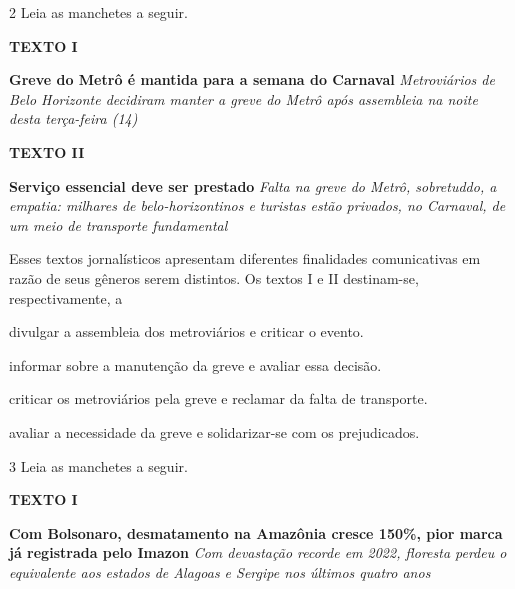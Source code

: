 \num{2} Leia as manchetes a seguir.

\textbf{TEXTO I}

\begin{myquote}
\textbf{Greve do Metrô é mantida para a semana do Carnaval}
\emph{Metroviários de Belo Horizonte decidiram manter a greve do Metrô
após assembleia na noite desta terça-feira (14)}
\end{myquote}


\textbf{TEXTO II}

\begin{myquote}
\textbf{Serviço essencial deve ser prestado} \emph{Falta na greve do
Metrô, sobretuddo, a empatia: milhares de belo-horizontinos e turistas
estão privados, no Carnaval, de um meio de transporte fundamental}
\end{myquote}


Esses textos jornalísticos apresentam diferentes finalidades
comunicativas em razão de seus gêneros serem distintos. Os textos I e II
destinam-se, respectivamente, a

\begin{escolha}
\item divulgar a assembleia dos metroviários e criticar o evento.

\item informar sobre a manutenção da greve e avaliar essa decisão.

\item criticar os metroviários pela greve e reclamar da falta de
transporte.

\item avaliar a necessidade da greve e solidarizar-se com os prejudicados.
\end{escolha}

\num{3} Leia as manchetes a seguir.

\textbf{TEXTO I}

\begin{myquote}
\textbf{Com Bolsonaro, desmatamento na Amazônia cresce 150\%, pior marca
já registrada pelo Imazon} \emph{Com devastação recorde em 2022,
floresta perdeu o equivalente aos estados de Alagoas e Sergipe nos
últimos quatro anos}
\end{myquote}

